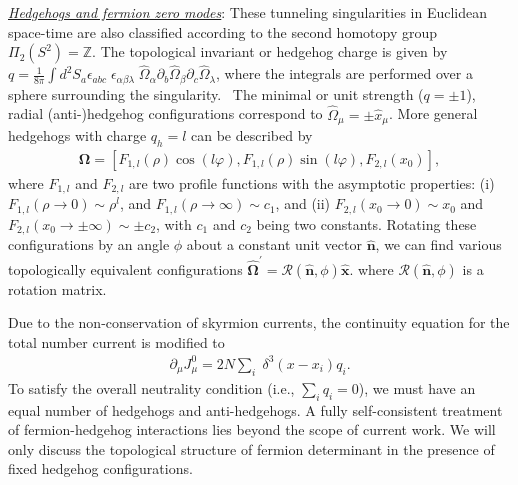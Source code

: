 \documentclass[aps,prb,amsmath,amssymb,floatfix,twocolumn]{revtex4}
\begin{document}
\underline{\emph{Hedgehogs and fermion zero modes}}:
These tunneling singularities in Euclidean space-time are also classified according to the second homotopy group $\Pi_2(S^2)=\mathbb{Z}$. The topological invariant or hedgehog charge is given by 
$q=\frac{1}{8\pi} \int d^2S_{a} \epsilon_{abc} \; \epsilon_{\alpha \beta \lambda} \; \hat{\Omega}_{\alpha} \partial_b \hat{\Omega}_{\beta} \partial_c \hat{\Omega}_{\lambda}$,
where the integrals are performed over a sphere surrounding the singularity.~\cite{Arafune} The minimal or unit strength ($q=\pm 1$), radial (anti-)hedgehog configurations correspond to $\hat{\Omega}_\mu = \pm \hat{x}_\mu$. More general hedgehogs with charge $q_h = l$ can be described by 
\begin{eqnarray}
\mathbf{\Omega}=\left[F_{1,l} (\rho) \cos(l \varphi), F_{1,l} (\rho) \sin(l \varphi), F_{2,l}(x_0) \right],\label{eq4}
\end{eqnarray}
where $F_{1,l}$ and $F_{2,l}$ are two profile functions with the asymptotic properties: (i) $F_{1,l} (\rho \to 0) \sim \rho^l$, and $F_{1, l} (\rho \to \infty) \sim c_1$, and (ii) $F_{2,l} (x_0 \to 0) \sim x_0$ and $F_{2,l} (x_0 \to \pm \infty) \sim \pm c_2$, with $c_1$ and $c_2$ being two constants.
Rotating these configurations by an angle $\phi$ about a constant unit vector $\hat{\mathbf{n}}$, we can find various topologically equivalent configurations 
$\hat{\mathbf{\Omega}}^\prime=\mathcal{R}(\hat{\mathbf{n}},\phi) \hat{\mathbf{x}}$. 
where $\mathcal{R}(\hat{\mathbf{n}},\phi)$ is a rotation matrix. 

Due to the non-conservation of skyrmion currents, the continuity equation for the total number current is modified to
\begin{eqnarray}
\partial_\mu J^0_{\mu}
=2N \sum_{i} \;\delta^3(x-x_{i}) q_{i} .\label{eq5}
\end{eqnarray}
To satisfy the overall neutrality condition (i.e., $\sum_i q_{i}=0$), we must have an equal number of hedgehogs and anti-hedgehogs. A fully self-consistent treatment of fermion-hedgehog interactions lies beyond the scope of current work. We will only discuss the topological structure of fermion determinant in the presence of fixed hedgehog configurations. 
\end{document}
